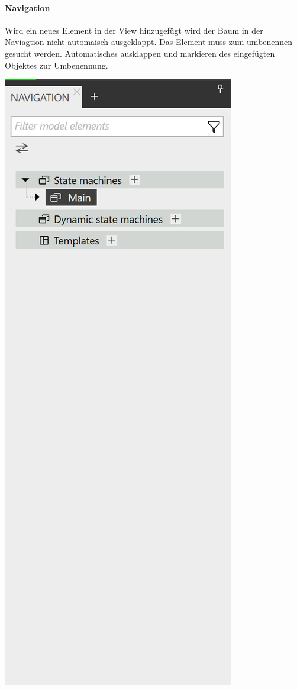 \paragraph{Navigation}
Wird ein neues Element in der View hinzugefügt wird der Baum in der Naviagtion nicht automaisch ausgeklappt. Das Element muss zum umbenennen gesucht werden. Automatisches ausklappen und markieren des eingefügten Objektes zur Umbenennung.

\begin{center}
  \includegraphics[scale=0.5]{figures/Navigation.png}
  \label{fig:Navigation}
\end{center}


